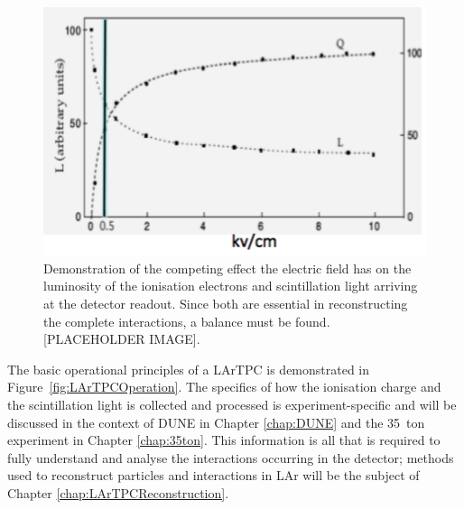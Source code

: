 \begin{figure}
  \centering
  \includegraphics[width=12cm]{ElectricFieldScintillationIonisation.png}
  \caption[Effect of electric field on luminosity of ionisation electrons and scintillation light in a LArTPC.]{Demonstration of the competing effect the electric field has on the luminosity of the ionisation electrons and scintillation light arriving at the detector readout.  Since both are essential in reconstructing the complete interactions, a balance must be found. [PLACEHOLDER IMAGE].}
  \label{fig:ElectricFieldScintillationIonisation}
\end{figure}

The basic operational principles of a LArTPC is demonstrated in Figure~\ref{fig:LArTPCOperation}.  The specifics of how the ionisation charge and the scintillation light is collected and processed is experiment-specific and will be discussed in the context of DUNE in Chapter \ref{chap:DUNE} and the 35~ton experiment in Chapter \ref{chap:35ton}.  This information is all that is required to fully understand and analyse the interactions occurring in the detector; methods used to reconstruct particles and interactions in LAr will be the subject of Chapter \ref{chap:LArTPCReconstruction}.

